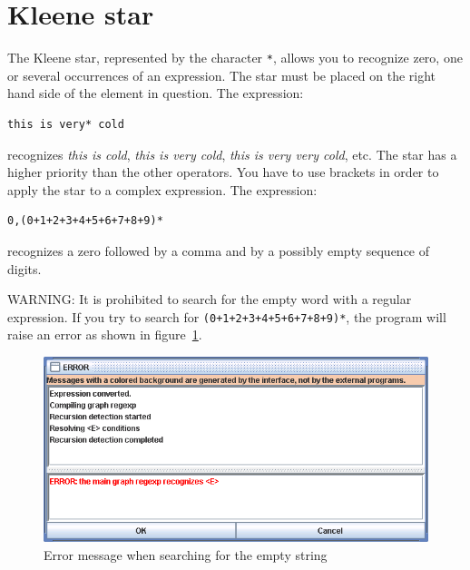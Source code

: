 \section{Kleene star}
\index{\verb+*+}
The Kleene star, represented by the character \verb+*+,  allows you to recognize
zero, one or several occurrences of an expression. The star must be placed on
the right hand side of the element in question. The expression:

\begin{verbatim}
this is very* cold
\end{verbatim}

\noindent recognizes \textit{this is cold}, \textit{this is very cold},
\textit{this is very very cold}, etc. The star has a higher priority than the
other operators. You have to use brackets in order to apply the star to a complex
expression. The expression:


\begin{verbatim}
0,(0+1+2+3+4+5+6+7+8+9)*
\end{verbatim}

\noindent recognizes a zero followed by a comma and by a possibly empty sequence of
digits.

\bigskip
\noindent WARNING: It is prohibited to search for the empty word with a regular
expression. If you try to search for \verb$(0+1+2+3+4+5+6+7+8+9)*$, the program
will raise an error as shown in
figure~\ref{fig-epsilon-error}.


\bigskip
\begin{figure}[h]
\begin{center}
\includegraphics[width=14cm]{resources/img/fig4-3.png}
\caption{Error message when searching for the empty
string\label{fig-epsilon-error}}
\end{center}
\end{figure}


